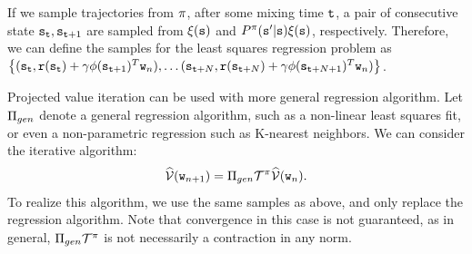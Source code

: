 \begin{enumerate}
If we sample trajectories from $\pi$, after some mixing time ${\tt t}$, a pair of consecutive state ${\tt s}_{\tt t}, {\tt s}_{{\tt t}+1}$ are sampled from $\xi({\tt s})$ and $P^\pi({\tt s}'|{\tt s})\xi({\tt s})$, respectively. Therefore, we can define the samples for the least squares regression problem as $\left\{({\tt s}_{\tt t}, {\tt r}({\tt s}_{\tt t}) +\gamma \phi({\tt s}_{{\tt t}+1})^T {\tt w}_n), \dots  ({\tt s}_{{\tt t}+N}, {\tt r}({\tt s}_{{\tt t}+N}) +\gamma \phi({\tt s}_{{\tt t}+N+1})^T {\tt w}_n)\right\}$.


\begin{remark}
Projected value iteration can be used with more general regression algorithm. Let $\Pi_{gen}$ denote a general regression algorithm, such as a non-linear least squares fit, or even a non-parametric regression such as K-nearest neighbors. We can consider the iterative algorithm:
$$\widehat{\mathcal{V}}({\tt w}_{n+1}) = \Pi_{gen} \mathcal{T}^\pi \widehat{\mathcal{V}}({\tt w}_{n}).$$
To realize this algorithm, we use the same samples as above, and only replace the regression algorithm. Note that convergence in this case is not guaranteed, as in general, $\Pi_{gen} \mathcal{T}^\pi$ is not necessarily a contraction in any norm.
\end{remark}


\end{enumerate}
